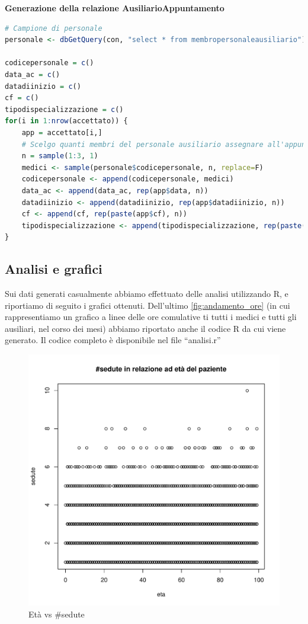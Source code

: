\documentclass[11pt]{article}
\begin{document}
\textbf{Generazione della relazione AusiliarioAppuntamento}
\begin{lstlisting}[language=R]
# Campione di personale
personale <- dbGetQuery(con, "select * from membropersonaleausiliario")

codicepersonale = c()
data_ac = c()
datadiinizio = c()
cf = c()
tipodispecializzazione = c()
for(i in 1:nrow(accettato)) {
    app = accettato[i,]
    # Scelgo quanti membri del personale ausiliario assegnare all'appuntamento
    n = sample(1:3, 1)
    medici <- sample(personale$codicepersonale, n, replace=F)
    codicepersonale <- append(codicepersonale, medici)
    data_ac <- append(data_ac, rep(app$data, n))
    datadiinizio <- append(datadiinizio, rep(app$datadiinizio, n))
    cf <- append(cf, rep(paste(app$cf), n))
    tipodispecializzazione <- append(tipodispecializzazione, rep(paste(app$tipodispecializzazione), n)) #$
}
\end{lstlisting}

\subsection{Analisi e grafici}
Sui dati generati casualmente abbiamo effettuato delle analisi utilizzando R, e riportiamo di seguito i grafici ottenuti. Dell'ultimo \ref{fig:andamento_ore} (in cui rappresentiamo un grafico a linee delle ore comulative ti tutti i medici e tutti gli ausiliari, nel corso dei mesi) abbiamo riportato anche il codice R da cui viene generato.
Il codice completo è disponibile nel file ``analisi.r''

\begin{figure}[H]
    \includegraphics[width=\linewidth]{eta_vs_sedute.pdf}
    \caption{Età vs \#sedute}
    \label{fig:eta_vs_sedute}
\end{figure}
\end{document}
